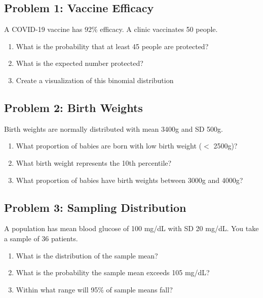 \documentclass[11pt]{article}
\begin{document}
\subsection{Problem 1: Vaccine Efficacy}

A COVID-19 vaccine has 92\% efficacy. A clinic vaccinates 50 people.

\begin{enumerate}[label=\alph*)]
\item What is the probability that at least 45 people are protected?
\item What is the expected number protected?
\item Create a visualization of this binomial distribution
\end{enumerate}

\vspace{2cm}

\subsection{Problem 2: Birth Weights}

Birth weights are normally distributed with mean 3400g and SD 500g.

\begin{enumerate}[label=\alph*)]
\item What proportion of babies are born with low birth weight ($<$ 2500g)?
\item What birth weight represents the 10th percentile?
\item What proportion of babies have birth weights between 3000g and 4000g?
\end{enumerate}

\vspace{2cm}

\subsection{Problem 3: Sampling Distribution}

A population has mean blood glucose of 100 mg/dL with SD 20 mg/dL. You take a sample of 36 patients.

\begin{enumerate}[label=\alph*)]
\item What is the distribution of the sample mean?
\item What is the probability the sample mean exceeds 105 mg/dL?
\item Within what range will 95\% of sample means fall?
\end{enumerate}
\end{document}
